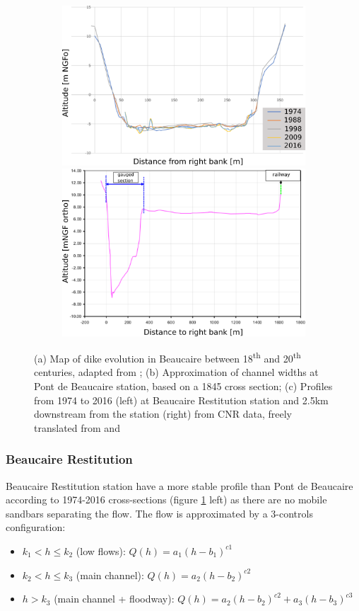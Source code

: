 \documentclass[11pt]{article}
\begin{document}
\begin{figure}[h!]
            \begin{subfigure}{.9\linewidth}
            \includegraphics[width=.48\linewidth]{Figs/3c-ProfilsBardRestit.png}
            \includegraphics[width=.48\linewidth]{Figs/3c-ProfilAvalRestitEN.png}
            \caption{}
            \label{subfig:avalprofilesRestit}
            \end{subfigure}
            
            \caption{(a) Map of dike evolution in Beaucaire between 18\textsuperscript{th} and 20\textsuperscript{th} centuries, adapted from \citet{armand_ii_1907}; (b) Approximation of channel widths at Pont de Beaucaire station, based on a 1845 cross section; (c) Profiles from 1974 to 2016 (left) at Beaucaire Restitution station and 2.5km downstream from the station (right) from CNR data, freely translated from \citet{bard_actualisation_2018} and \citet{medd_debit_2005}}
            \label{fig:groupPriorPt}
        \end{figure}


        \subsubsection{Beaucaire Restitution}
        
        Beaucaire Restitution station have a more stable profile than Pont de Beaucaire according to 1974-2016 cross-sections (figure \ref{subfig:avalprofilesRestit} left) as there are no mobile sandbars separating the flow. The flow is approximated by a 3-controls configuration:
        
        \begin{itemize}
            \item $k_1 < h \leq k_2 $ (low flows): $Q(h) = a_1(h-b_1)^{c1}$
            \item $k_2 < h \leq k_3 $ (main channel): $Q(h) = a_2(h-b_2)^{c2}$
            \item $h > k_3$ (main channel + floodway):  $Q(h) = a_2(h-b_2)^{c2}+ a_3(h-b_3)^{c3}$
        \end{itemize}
        
\end{document}
